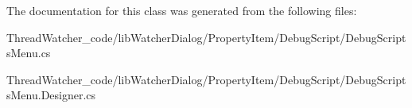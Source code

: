 The documentation for this class was generated from the following files\+:\begin{DoxyCompactItemize}
\item 
Thread\+Watcher\+\_\+code/lib\+Watcher\+Dialog/\+Property\+Item/\+Debug\+Script/Debug\+Scripts\+Menu.\+cs\item 
Thread\+Watcher\+\_\+code/lib\+Watcher\+Dialog/\+Property\+Item/\+Debug\+Script/Debug\+Scripts\+Menu.\+Designer.\+cs\end{DoxyCompactItemize}
